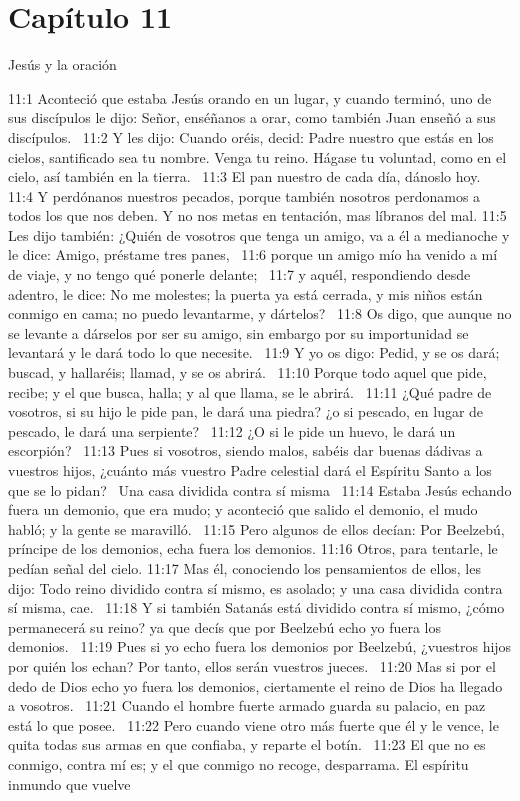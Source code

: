 \section*{Capítulo 11 }
Jesús y la oración   

11:1 Aconteció que estaba Jesús orando en un lugar, y cuando terminó, uno de sus discípulos le dijo: Señor, enséñanos a orar, como también Juan enseñó a sus discípulos.  
11:2 Y les dijo: Cuando oréis, decid: Padre nuestro que estás en los cielos, santificado sea tu nombre. Venga tu reino. Hágase tu voluntad, como en el cielo, así también en la tierra.  
11:3 El pan nuestro de cada día, dánoslo hoy.  
11:4 Y perdónanos nuestros pecados, porque también nosotros perdonamos a todos los que nos deben. Y no nos metas en tentación, mas líbranos del mal. 
11:5 Les dijo también: ¿Quién de vosotros que tenga un amigo, va a él a medianoche y le dice: Amigo, préstame tres panes,  
11:6 porque un amigo mío ha venido a mí de viaje, y no tengo qué ponerle delante;  
11:7 y aquél, respondiendo desde adentro, le dice: No me molestes; la puerta ya está cerrada, y mis niños están conmigo en cama; no puedo levantarme, y dártelos?  
11:8 Os digo, que aunque no se levante a dárselos por ser su amigo, sin embargo por su importunidad se levantará y le dará todo lo que necesite.  
11:9 Y yo os digo: Pedid, y se os dará; buscad, y hallaréis; llamad, y se os abrirá.  
11:10 Porque todo aquel que pide, recibe; y el que busca, halla; y al que llama, se le abrirá.  
11:11 ¿Qué padre de vosotros, si su hijo le pide pan, le dará una piedra? ¿o si pescado, en lugar de pescado, le dará una serpiente?  
11:12 ¿O si le pide un huevo, le dará un escorpión?  
11:13 Pues si vosotros, siendo malos, sabéis dar buenas dádivas a vuestros hijos, ¿cuánto más vuestro Padre celestial dará el Espíritu Santo a los que se lo pidan?  
Una casa dividida contra sí misma   
11:14 Estaba Jesús echando fuera un demonio, que era mudo; y aconteció que salido el demonio, el mudo habló; y la gente se maravilló.  
11:15 Pero algunos de ellos decían: Por Beelzebú, príncipe de los demonios, echa fuera los demonios. 
11:16 Otros, para tentarle, le pedían señal del cielo. 
11:17 Mas él, conociendo los pensamientos de ellos, les dijo: Todo reino dividido contra sí mismo, es asolado; y una casa dividida contra sí misma, cae.  
11:18 Y si también Satanás está dividido contra sí mismo, ¿cómo permanecerá su reino? ya que decís que por Beelzebú echo yo fuera los demonios.  
11:19 Pues si yo echo fuera los demonios por Beelzebú, ¿vuestros hijos por quién los echan? Por tanto, ellos serán vuestros jueces.  
11:20 Mas si por el dedo de Dios echo yo fuera los demonios, ciertamente el reino de Dios ha llegado a vosotros.  
11:21 Cuando el hombre fuerte armado guarda su palacio, en paz está lo que posee.  
11:22 Pero cuando viene otro más fuerte que él y le vence, le quita todas sus armas en que confiaba, y reparte el botín.  
11:23 El que no es conmigo, contra mí es; y el que conmigo no recoge, desparrama. 
El espíritu inmundo que vuelve  

